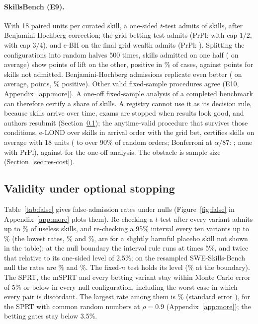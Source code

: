\paragraph{SkillsBench (E9).} With 18 paired units per curated skill, a one-sided $t$-test admits \NSbT{} of \NSbTasks{} skills, \NSbTBH{} after Benjamini-Hochberg correction; the grid betting test admits \NSbBet{} (PrPl: \NSbBetPrpl{} with cap $1/2$, \NSbBetHi{} with cap $3/4$), and e-BH on the final grid wealth admits \NSbEBH{} (PrPl: \NSbEBHPrpl). Splitting the configurations into random halves 500 times, skills admitted on one half (\NSbSplitAdm{} on average) show \NSbSplitLift{} points of lift on the other, positive in \NSbSplitPos\% of cases, against \NSbSplitNot{} points for skills not admitted. Benjamini-Hochberg admissions replicate even better (\NSbSplitBHAdm{} on average, \NSbSplitBHLift{} points, \NSbSplitBHPos\% positive). Other valid fixed-sample procedures agree (E10, Appendix~\ref{app:more}). A one-off fixed-sample analysis of a completed benchmark can therefore certify a share of skills. A registry cannot use it as its decision rule, because skills arrive over time, exams are stopped when results look good, and authors resubmit (Section~\ref{sec:res-validity}); the anytime-valid procedure that survives those conditions, e-LOND over skills in arrival order with the grid bet, certifies \NSbELond{} skills on average with 18 units (\NSbELondLo{} to \NSbELondHi{} over 90\% of random orders; Bonferroni at $\alpha/87$: \NSbBonfBet; none with PrPl), against \NSbTBH{} for the one-off analysis. The obstacle is sample size (Section~\ref{sec:res-cost}).

\subsection{Validity under optional stopping}
\label{sec:res-validity}

Table~\ref{tab:false} gives false-admission rates under nulls (Figure~\ref{fig:false} in Appendix~\ref{app:more} plots them). Re-checking a $t$-test after every variant admits up to \NEOnePeekTMax\% of useless skills, and re-checking a 95\% interval every ten variants up to \NEOnePeekCIMax\% (the lowest rates, \NEOnePeekTMin\% and \NEOnePeekCIMin\%, are for a slightly harmful placebo skill not shown in the table); at the null boundary the interval rule runs at \NEOnePeekRatio{} times 5\%, and twice that relative to its one-sided level of 2.5\%; on the resampled SWE-Skills-Bench null the rates are \NEEightNullPeekT\% and \NEEightNullPeekCI\%. The fixed-$n$ test holds its level (\NEOneFixed\% at the boundary). The SPRT, the mSPRT and every betting variant stay within Monte Carlo error of 5\% or below in every null configuration, including the worst case in which every pair is discordant. The largest rate among them is \NEOneValidMax\% (standard error \NEOneValidMaxSE), for the SPRT with common random numbers at $\rho=0.9$ (Appendix~\ref{app:more}); the betting gates stay below 3.5\%.

